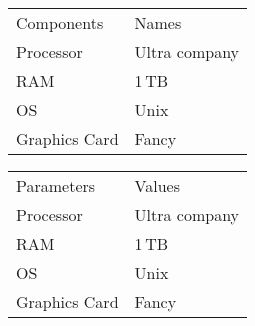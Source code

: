 \begin{table}
    \centering
    \begin{tabular}{p{3cm} l}
        \toprule
        \multicolumn{1}{N}{Components} & \multicolumn{1}{N}{Names}\\
        \cmidrule(){1-1}\cmidrule(){2-2}
        Processor     & Ultra company \\
        RAM           & 1\,TB         \\
        OS            & Unix          \\
        Graphics Card & Fancy         \\         
        \bottomrule
    \end{tabular}
\end{table}

\begin{table}
    \centering
    \begin{tabular}{p{3cm} l}
        \toprule
        \multicolumn{1}{N}{Parameters} & \multicolumn{1}{N}{Values}\\
        \cmidrule(lr){1-1}\cmidrule(lr){2-2}
        Processor     & Ultra company \\
        RAM           & 1\,TB         \\
        OS            & Unix          \\     
        Graphics Card & Fancy         \\         
      \bottomrule
    \end{tabular}
\end{table}

